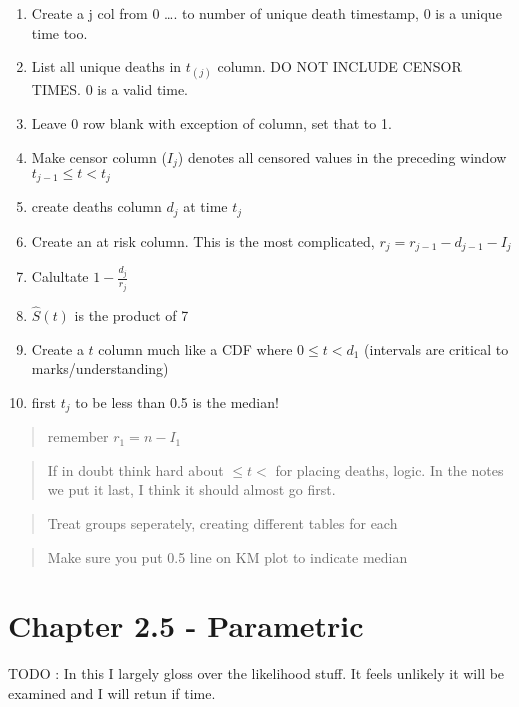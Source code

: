\documentclass[
  letterpaper,
  DIV=11,
  numbers=noendperiod]{scrreprt}
\providecommand{\tightlist}{%
  \setlength{\itemsep}{0pt}\setlength{\parskip}{0pt}}\usepackage{longtable,booktabs,array}
\begin{document}
\begin{enumerate}
\def\labelenumi{\arabic{enumi})}
\tightlist
\item
  Create a j col from 0 \ldots. to number of unique death timestamp, 0
  is a unique time too.
\item
  List all unique deaths in \(t_{(j)}\) column. DO NOT INCLUDE CENSOR
  TIMES. 0 is a valid time.
\item
  Leave 0 row blank with exception of  column, set that to 1.
\item
  Make censor column (\(I_j\)) denotes all censored values in the
  preceding window \(t_{j-1} \leq t < t_j\)
\item
  create deaths column \(d_j\) at time \(t_j\)
\item
  Create an at risk column. This is the most complicated,
  \(r_j = r_{j-1} - d_{j-1} - I_j\)
\item
  Calultate \(1 - \frac{d_j}{r_j}\)
\item
  \(\hat{S}(t)\) is the product of 7
\item
  Create a \(t\) column much like a CDF where \(0 \leq t < d_1\)
  (intervals are critical to marks/understanding)
\item
  first \(t_j\) to be less than 0.5 is the median!
\end{enumerate}

\begin{quote}
remember \(r_1 = n - I_1\)
\end{quote}

\begin{quote}
If in doubt think hard about \(\leq t <\) for placing deaths, logic. In
the notes we put it last, I think it should almost go first.
\end{quote}

\begin{quote}
Treat groups seperately, creating different tables for each
\end{quote}

\begin{quote}
Make sure you put 0.5 line on KM plot to indicate median
\end{quote}

\hypertarget{chapter-2.5---parametric}{%
\section{Chapter 2.5 - Parametric}\label{chapter-2.5---parametric}}

TODO : In this I largely gloss over the likelihood stuff. It feels
unlikely it will be examined and I will retun if time.
\end{document}
